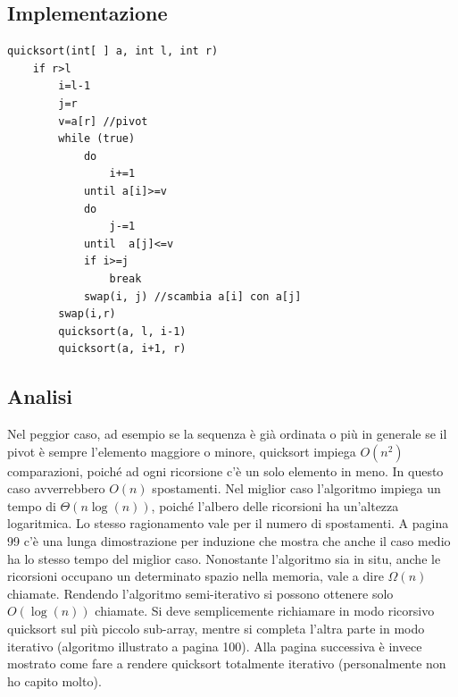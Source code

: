 \documentclass[a4paper]{book}
\newcommand{\lstIndent}{4}
\begin{document}
\subsection*{Implementazione}

\begin{lstlisting}[tabsize=\lstIndent]
quicksort(int[ ] a, int l, int r)
	if r>l
		i=l-1
		j=r
		v=a[r] //pivot
		while (true)
			do
				i+=1
			until a[i]>=v
			do
				j-=1
			until  a[j]<=v
			if i>=j
				break
			swap(i, j) //scambia a[i] con a[j]
	 	swap(i,r)
		quicksort(a, l, i-1)
		quicksort(a, i+1, r)
\end{lstlisting}    
      
\subsection*{Analisi}
Nel peggior caso, ad esempio se la sequenza è già ordinata o più in generale se il pivot è sempre l'elemento maggiore o minore, quicksort impiega $O(n^2)$ comparazioni, poiché ad ogni ricorsione c'è un solo elemento in meno. In questo caso avverrebbero $O(n)$ spostamenti. Nel miglior caso l'algoritmo impiega un tempo di $\Theta (n\log (n))$, poiché l'albero delle ricorsioni ha un'altezza logaritmica. Lo stesso ragionamento vale per il numero di spostamenti. A pagina 99 c'è una lunga dimostrazione per induzione che mostra che anche il caso medio ha lo stesso tempo del miglior caso. Nonostante l'algoritmo sia in situ, anche le ricorsioni occupano un determinato spazio nella memoria, vale a dire $\Omega (n)$ chiamate. Rendendo l'algoritmo semi-iterativo si possono ottenere solo $O(\log (n))$ chiamate. Si deve semplicemente richiamare in modo ricorsivo quicksort sul più piccolo sub-array, mentre si completa l'altra parte in modo iterativo (algoritmo illustrato a pagina 100). Alla pagina successiva è invece mostrato come fare a rendere quicksort totalmente iterativo (personalmente non ho capito molto). 
            
\end{document}

